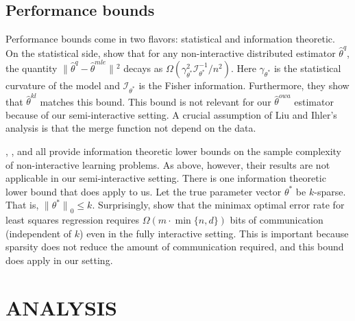 \documentclass[twoside]{article}
\newcommand{\w}{\theta}
\newcommand{\wkl}{\hat\w^{kl}}
\newcommand{\wowa}{\hat\w^{owa}}
\newcommand{\wmle}{\hat\w^{mle}}
\newcommand{\wstar}{{\w^{*}}}
\newcommand{\wq}{\hat\w^{q}}
\newcommand{\I}{\mathcal I}
\newcommand{\ltwo}[1]{{\lVert {#1} \rVert}}
\newcommand{\lzero}[1]{{\lVert {#1} \rVert}_0}
\begin{document}
\subsection{Performance bounds}
\label{sec:bounds}

Performance bounds come in two flavors: statistical and information theoretic.
On the statistical side, \cite{liu2014distributed} show that for any non-interactive distributed estimator $\wq$,
the quantity $\ltwo{\wq-\wmle}{}^2$ decays as $\Omega(\gamma^2_\wstar \I^{-1}_\wstar/n^2)$.
Here $\gamma_\wstar$ is the statistical curvature of the model and $\I_\wstar$ is the Fisher information.
Furthermore, they show that $\wkl$ matches this bound.
This bound is not relevant for our $\wowa$ estimator because of our semi-interactive setting.
A crucial assumption of Liu and Ihler's analysis is that the merge function not depend on the data.

\cite{shamir2014fundamental}, \cite{zhang2013information}, and \cite{garg2014communication} all provide information theoretic lower bounds on the sample complexity of non-interactive learning problems.
As above, however, their results are not applicable in our semi-interactive setting.
There is one information theoretic lower bound that does apply to us.
Let the true parameter vector $\wstar$ be $k$-sparse.
That is, $\lzero{\wstar} \le k$.
Surprisingly, \cite{braverman2015communication} show that the minimax optimal error rate for least squares regression requires $\Omega(m\cdot\min\{n,d\})$ bits of communication (independent of $k$) even in the fully interactive setting.
This is important because sparsity does not reduce the amount of communication required, and this bound does apply in our setting.

\section{ANALYSIS}
\label{sec:anal}
\end{document}
